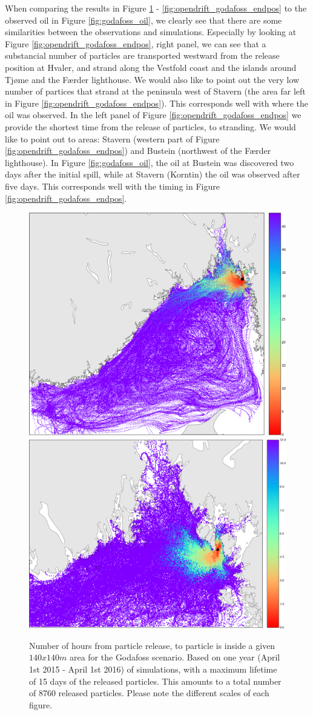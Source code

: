 When comparing the results in Figure \ref{fig:opendrift_godafoss_time} - \ref{fig:opendrift_godafoss_endpos} to the observed oil in Figure \ref{fig:godafoss_oil}, we clearly see that there are some similarities between the observations and simulations. Especially by looking at Figure \ref{fig:opendrift_godafoss_endpos}, right panel, we can see that a substancial number of particles are transported westward from the release position at Hvaler, and strand along the Vestfold coast and the islands around Tj{\o}me and the F{\ae}rder lighthouse. We would also like to point out the very low number of partices that strand at the peninsula west of Stavern (the area far left in Figure \ref{fig:opendrift_godafoss_endpos}). This corresponds well with where the oil was observed.
In the left panel of Figure \ref{fig:opendrift_godafoss_endpos} we provide the shortest time from the release of particles, to stranding. We would like to point out to areas: Stavern (western part of Figure 
\ref{fig:opendrift_godafoss_endpos}) and Bustein (northwest of the F{\ae}rder lighthouse). In Figure \ref{fig:godafoss_oil}, the oil at Bustein was discovered two days after the initial spill, while at Stavern (Korntin) the oil was observed after five days. This corresponds well with the timing in Figure \ref{fig:opendrift_godafoss_endpos}.

\begin{figure}[ht]
\centerline{
\includegraphics*[width=.5\textwidth]{Figurer/opendrift/opendrift_godafoss_shortest_time_crop}
\includegraphics*[width=.5\textwidth]{Figurer/opendrift/opendrift_godafoss_shortest_time_zoom_crop}
}
\caption{\small
Number of hours from particle release, to particle is inside a given $140x140m$ area for the Godafoss scenario. Based on one year (April 1st 2015 - April 1st 2016) of simulations, with a maximum lifetime of 15 days of the released particles. This amounts to a total number of $8760$ released particles. Please note the different scales of each figure.}
\label{fig:opendrift_godafoss_time}
\end{figure}

